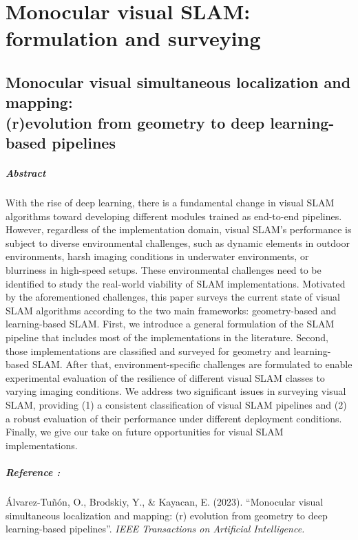 \chapter{Monocular visual SLAM: formulation and surveying}
\label{chapter:paper1}
\section*{Monocular visual simultaneous localization and mapping: \\(r)evolution from geometry to deep learning-based pipelines}
\paragraph*{Abstract}
With the rise of deep learning, there is a fundamental change in visual \ac{SLAM} algorithms toward developing different modules trained as end-to-end pipelines.  However, regardless of the implementation domain, visual SLAM’s performance is subject to diverse environmental challenges, such as dynamic elements in outdoor environments, harsh imaging conditions in underwater environments, or blurriness in high-speed setups. These environmental challenges need to be identified to study the real-world viability of SLAM implementations. Motivated by the aforementioned challenges, this paper surveys the current state of visual SLAM algorithms according to the two main frameworks: geometry-based and learning-based SLAM. First, we introduce a general formulation of the SLAM pipeline that includes most of the implementations in the literature. Second, those implementations are classified and surveyed for geometry and learning-based SLAM. After that, environment-specific challenges are formulated to enable experimental evaluation of the resilience of different visual SLAM classes to varying imaging conditions. We address two significant issues in surveying visual SLAM, providing (1) a consistent classification of visual SLAM pipelines and (2) a robust evaluation of their performance under different deployment conditions. Finally, we give our take on future opportunities for visual SLAM implementations.

\paragraph*{Reference \cite{olaya_survey}:}
Álvarez-Tuñón, O., Brodskiy, Y., \& Kayacan, E. (2023). ``Monocular visual simultaneous localization and mapping: (r) evolution from geometry to deep learning-based pipelines''. \textit{IEEE Transactions on Artificial Intelligence.}








